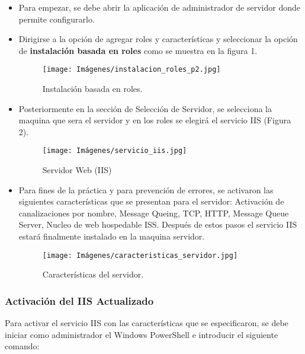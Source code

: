 \documentclass[letterpaper,12pt]{article} %
\begin{document}
\begin{itemize}
    \item Para empezar, se debe abrir la aplicación de administrador de servidor donde permite configurarlo.
    \item Dirigirse a la opción de agregar roles y características y seleccionar la opción de \textbf{instalación basada en roles} como se muestra en la figura 1.
    
    \begin{figure}[htp!]
        \centering
        \texttt{[image: Imágenes/instalacion\_roles\_p2.jpg]}
        \caption{Instalación basada en roles.}
        \label{fig:instalacion_roles}
    \end{figure}
    
    \newpage
    
    \item Posteriormente en la sección de Selección de Servidor, se selecciona la maquina que sera el servidor y en los roles se elegirá el servicio IIS (Figura 2).
    
    \begin{figure}[htp!]
        \centering
        \texttt{[image: Imágenes/servicio\_iis.jpg]}
        \caption{Servidor Web (IIS)}
        \label{fig:servicio_iis}
    \end{figure}
    
    
    \item Para fines de la práctica y para prevención de errores, se activaron las siguientes características que se presentan para el servidor: Activación de canalizaciones por nombre, Message Queing, TCP, HTTP, Message Queue Server, Nucleo de web hospedable ISS. Después de estos pasos el servicio IIS estará finalmente instalado en la maquina servidor.
    
    \begin{figure}[htp!]
        \centering
        \texttt{[image: Imágenes/caracteristicas\_servidor.jpg]}
        \caption{Características del servidor.}
        \label{fig:caracteristicas_servidor}
    \end{figure}
\end{itemize}

\newpage

\subsubsection{Activación del IIS Actualizado}
Para activar el servicio IIS con las características que se especificaron, se debe iniciar como administrador el Windows PowerShell e introducir el siguiente comando:\par
\end{document}
